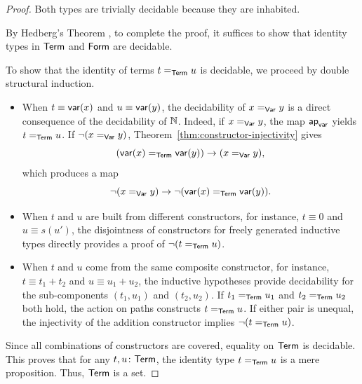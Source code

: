 \begin{proof}
    Both types are trivially decidable because they are inhabited.
    
    By Hedberg's Theorem \citep{caniglia2025hott}, to complete the proof, it suffices to show that identity types in $\mathsf{Term}$ and $\mathsf{Form}$ are decidable.

    To show that the identity of terms $t\mathrel{=_{\mathsf{Term}}}u$ is decidable, we proceed by double structural induction.
    \begin{itemize}
        \item When $t\equiv\mathsf{var}(x)$ and $u\equiv\mathsf{var}(y)$, the decidability of $x\mathrel{=_{\mathsf{Var}}}y$ is a direct consequence of the decidability of $\mathbb{N}$. Indeed, if $x\mathrel{=_{\mathsf{Var}}}y$, the map $\mathsf{ap}_{\mathsf{var}}$ yields $t\mathrel{=_{\mathsf{Term}}}u$. If $\neg(x\mathrel{=_{\mathsf{Var}}}y)$, Theorem~\ref{thm:constructor-injectivity} gives
        \[
            (\mathsf{var}(x)\mathrel{=_{\mathsf{Term}}}\mathsf{var}(y))
            \to
            (x\mathrel{=_{\mathsf{Var}}}y),
        \]
        which produces a map
        \[
            \neg(x\mathrel{=_{\mathsf{Var}}}y)
            \to
            \neg(\mathsf{var}(x)\mathrel{=_{\mathsf{Term}}}\mathsf{var}(y)).
        \]
        
        \item When $t$ and $u$ are built from different constructors, for instance, $t\equiv 0$ and $u\equiv s(u')$, the disjointness of constructors for freely generated inductive types directly provides a proof of $\neg(t\mathrel{=_{\mathsf{Term}}}u)$.
        
        \item When $t$ and $u$ come from the same composite constructor, for instance, $t\equiv t_1+t_2$ and $u\equiv u_1+u_2$, the inductive hypotheses provide decidability for the sub-components $(t_1, u_1)$ and $(t_2, u_2)$. If $t_1\mathrel{=_{\mathsf{Term}}}u_1$ and $t_2\mathrel{=_{\mathsf{Term}}}u_2$ both hold, the action on paths constructs $t\mathrel{=_{\mathsf{Term}}}u$. If either pair is unequal, the injectivity of the addition constructor implies $\neg(t\mathrel{=_{\mathsf{Term}}}u)$.
    \end{itemize}
    Since all combinations of constructors are covered, equality on $\mathsf{Term}$ is decidable. This proves that for any $t,u\colon\fun{Term}$, the identity type $t\mathrel{=_{\mathsf{Term}}}u$ is a mere proposition. Thus, $\mathsf{Term}$ is a set.


\end{proof}
